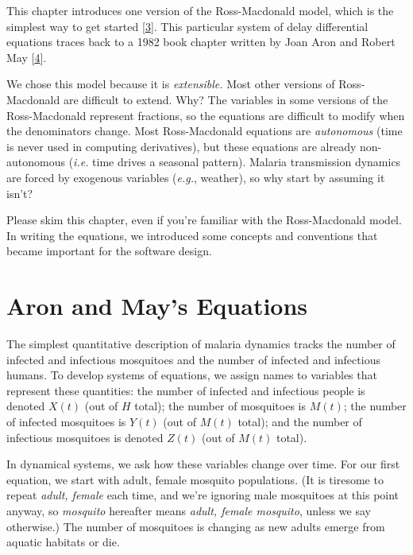\documentclass[
]{book}
\begin{document}
This chapter introduces one version of the Ross-Macdonald model, which is the simplest way to get started {[}\protect\hyperlink{ref-SmithDL2012_RossMacdonald}{3}{]}. This particular system of delay differential equations traces back to a 1982 book chapter written by Joan Aron and Robert May {[}\protect\hyperlink{ref-AronJL1982PopulationDynamics}{4}{]}.

We chose this model because it is \emph{extensible.} Most other versions of Ross-Macdonald are difficult to extend. Why? The variables in some versions of the Ross-Macdonald represent fractions, so the equations are difficult to modify when the denominators change. Most Ross-Macdonald equations are \emph{autonomous} (time is never used in computing derivatives), but these equations are already non-autonomous (\emph{i.e.} time drives a seasonal pattern). Malaria transmission dynamics are forced by exogenous variables (\emph{e.g.}, weather), so why start by assuming it isn't?

Please skim this chapter, even if you're familiar with the Ross-Macdonald model. In writing the equations, we introduced some concepts and conventions that became important for the software design.

\hypertarget{aron-and-mays-equations}{%
\section{Aron and May's Equations}\label{aron-and-mays-equations}}

The simplest quantitative description of malaria dynamics tracks the number of infected and infectious mosquitoes and the number of infected and infectious humans. To develop systems of equations, we assign names to variables that represent these quantities: the number of infected and infectious people is denoted \(X(t)\) (out of \(H\) total); the number of mosquitoes is \(M(t)\); the number of infected mosquitoes is \(Y(t)\) (out of \(M(t)\) total); and the number of infectious mosquitoes is denoted \(Z(t)\) (out of \(M(t)\) total).

In dynamical systems, we ask how these variables change over time. For our first equation, we start with adult, female mosquito populations. (It is tiresome to repeat \emph{adult, female} each time, and we're ignoring male mosquitoes at this point anyway, so \emph{mosquito} hereafter means \emph{adult, female mosquito}, unless we say otherwise.) The number of mosquitoes is changing as new adults emerge from aquatic habitats or die.
\end{document}
